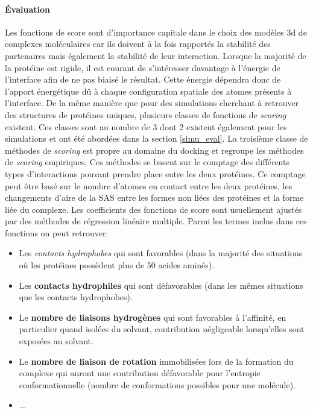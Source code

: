 \paragraph{Évaluation}

Les fonctions de score sont d'importance capitale dans le choix des modèles 3d de complexes moléculaires car ils doivent à la fois rapportés la stabilité des partenaires mais également la stabilité de leur interaction. Lorsque la majorité de la protéine est rigide, il est courant de s'intéresser davantage à l'énergie de l'interface afin de ne pas biaisé le résultat. Cette énergie dépendra donc de l'apport énergétique dû à chaque configuration spatiale des atomes présents à l'interface. De la même manière que pour des simulations cherchant à retrouver des structures de protéines uniques, plusieurs classes de fonctions de \textit{scoring} existent. Ces classes sont au nombre de 3 dont 2 existent également pour les simulations et ont été abordées dans la section \ref{simu_eval}. La troisième classe de méthodes de \textit{scoring} est propre au domaine du docking et regroupe les méthodes de \textit{scoring} empiriques.
Ces méthodes se basent sur le comptage des différents types d'interactions pouvant prendre place entre les deux protéines. Ce comptage peut être basé sur le nombre d'atomes en contact entre les deux protéines, les changements d'aire de la SAS entre les formes non liées des protéines et la forme liée du complexe. Les coefficients des fonctions de score sont usuellement ajustés par des méthodes de régression linéaire multiple. Parmi les termes inclus dans ces fonctions on peut retrouver:

\begin{itemize}
	\item Les \textit{contacts hydrophobes} qui sont favorables (dans la majorité des situations où les protéines possèdent plus de 50 acides aminés).
	\item Les \textbf{contacts hydrophiles} qui sont défavorables (dans les mêmes situations que les contacts hydrophobes).
	\item Le \textbf{nombre de liaisons hydrogènes} qui sont favorables à l'affinité, en particulier quand isolées du solvant, contribution négligeable lorsqu'elles sont exposées au solvant.
	\item Le \textbf{nombre de liaison de rotation} immobilisées lors de la formation du complexe qui auront une contribution défavorable pour l'entropie conformationnelle (nombre de conformations possibles pour une molécule).
	\item ...
\end{itemize}

